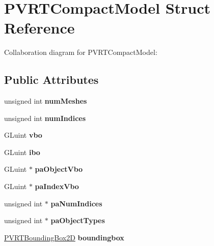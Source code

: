 \hypertarget{struct_p_v_r_t_compact_model}{\section{P\+V\+R\+T\+Compact\+Model Struct Reference}
\label{struct_p_v_r_t_compact_model}
}


Collaboration diagram for P\+V\+R\+T\+Compact\+Model\+:
\subsection*{Public Attributes}
\begin{DoxyCompactItemize}
\item 
\hypertarget{struct_p_v_r_t_compact_model_ab99b6fcc1c79c22ab60d96fa0754310d}{unsigned int {\bfseries num\+Meshes}}\label{struct_p_v_r_t_compact_model_ab99b6fcc1c79c22ab60d96fa0754310d}

\item 
\hypertarget{struct_p_v_r_t_compact_model_a1f4de39f86487c93e018200ccf43db5e}{unsigned int {\bfseries num\+Indices}}\label{struct_p_v_r_t_compact_model_a1f4de39f86487c93e018200ccf43db5e}

\item 
\hypertarget{struct_p_v_r_t_compact_model_a6ddd210a736aeaa9374aa94f23364ba2}{G\+Luint {\bfseries vbo}}\label{struct_p_v_r_t_compact_model_a6ddd210a736aeaa9374aa94f23364ba2}

\item 
\hypertarget{struct_p_v_r_t_compact_model_ac8e520fdbf0da42aec7c2a177d159eae}{G\+Luint {\bfseries ibo}}\label{struct_p_v_r_t_compact_model_ac8e520fdbf0da42aec7c2a177d159eae}

\item 
\hypertarget{struct_p_v_r_t_compact_model_acfbe992b9d3f2bb90acb1f4b590e2f28}{G\+Luint $\ast$ {\bfseries pa\+Object\+Vbo}}\label{struct_p_v_r_t_compact_model_acfbe992b9d3f2bb90acb1f4b590e2f28}

\item 
\hypertarget{struct_p_v_r_t_compact_model_a1116754245e74d96f910097731636c67}{G\+Luint $\ast$ {\bfseries pa\+Index\+Vbo}}\label{struct_p_v_r_t_compact_model_a1116754245e74d96f910097731636c67}

\item 
\hypertarget{struct_p_v_r_t_compact_model_a4d5f16f122e11a3e8402d333c6101509}{unsigned int $\ast$ {\bfseries pa\+Num\+Indices}}\label{struct_p_v_r_t_compact_model_a4d5f16f122e11a3e8402d333c6101509}

\item 
\hypertarget{struct_p_v_r_t_compact_model_aacc5b97455faf5d2cf91d2f86f00e073}{unsigned int $\ast$ {\bfseries pa\+Object\+Types}}\label{struct_p_v_r_t_compact_model_aacc5b97455faf5d2cf91d2f86f00e073}

\item 
\hypertarget{struct_p_v_r_t_compact_model_adffeb55cf5ae8ed72d26ae1529f31b98}{\hyperlink{struct_p_v_r_t_bounding_box2_d}{P\+V\+R\+T\+Bounding\+Box2\+D} {\bfseries boundingbox}}\label{struct_p_v_r_t_compact_model_adffeb55cf5ae8ed72d26ae1529f31b98}

\end{DoxyCompactItemize}


